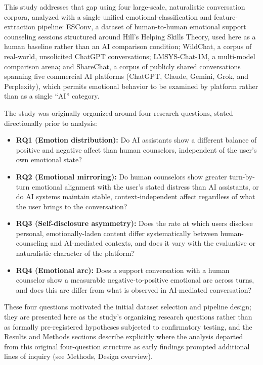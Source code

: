 \documentclass[11pt]{article}
\begin{document}
This study addresses that gap using four large-scale, naturalistic conversation corpora, analyzed with a single unified emotional-classification and feature-extraction pipeline: ESConv, a dataset of human-to-human emotional support counseling sessions structured around Hill's Helping Skills Theory, used here as a human baseline rather than an AI comparison condition; WildChat, a corpus of real-world, unsolicited ChatGPT conversations; LMSYS-Chat-1M, a multi-model comparison arena; and ShareChat, a corpus of publicly shared conversations spanning five commercial AI platforms (ChatGPT, Claude, Gemini, Grok, and Perplexity), which permits emotional behavior to be examined by platform rather than as a single ``AI'' category.

The study was originally organized around four research questions, stated directionally prior to analysis:

\begin{itemize}
  \item \textbf{RQ1 (Emotion distribution):} Do AI assistants show a different balance of positive and negative affect than human counselors, independent of the user's own emotional state?
  \item \textbf{RQ2 (Emotional mirroring):} Do human counselors show greater turn-by-turn emotional alignment with the user's stated distress than AI assistants, or do AI systems maintain stable, context-independent affect regardless of what the user brings to the conversation?
  \item \textbf{RQ3 (Self-disclosure asymmetry):} Does the rate at which users disclose personal, emotionally-laden content differ systematically between human-counseling and AI-mediated contexts, and does it vary with the evaluative or naturalistic character of the platform?
  \item \textbf{RQ4 (Emotional arc):} Does a support conversation with a human counselor show a measurable negative-to-positive emotional arc across turns, and does this arc differ from what is observed in AI-mediated conversation?
\end{itemize}

These four questions motivated the initial dataset selection and pipeline design; they are presented here as the study's organizing research questions rather than as formally pre-registered hypotheses subjected to confirmatory testing, and the Results and Methods sections describe explicitly where the analysis departed from this original four-question structure as early findings prompted additional lines of inquiry (see Methods, Design overview).
\end{document}
